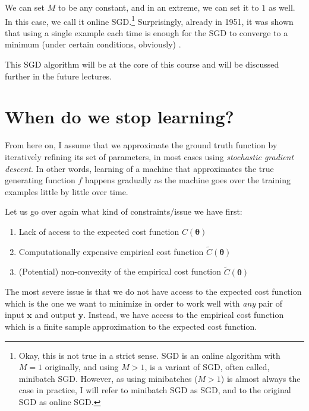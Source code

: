 \documentclass{report}
\newcommand{\vect}[1]{\mathbf{#1}}
\newcommand{\vects}[1]{\boldsymbol{#1}}
\newcommand{\vx}[0]{\vect{x}}
\newcommand{\vy}[0]{\vect{y}}
\newcommand{\TT}[0]{\vects{\theta}}
\begin{document}
We can set $M$ to be any constant, and in an extreme, we can set it to $1$ as
well. In this case, we call it online SGD.\footnote{
    Okay, this is not true in a strict sense. SGD is an online algorithm with
    $M=1$ originally, and using $M>1$, is a variant of SGD, often called,
    minibatch SGD. However, as using minibatches ($M>1$) is almost always the
    case in practice, I will refer to minibatch SGD as SGD, and to the original
    SGD as online SGD.
} Surprisingly, already in 1951, it was shown that using a single example each
time is enough for the SGD to converge to a minimum (under certain conditions,
obviously) \cite{Robbins1951}.

This SGD algorithm will be at the core of this course and will be discussed
further in the future lectures.


\section{When do we stop learning?}
\label{sec:model_selection}

From here on, I assume that we approximate the ground truth function by
iteratively refining its set of parameters, in most cases using {\em stochastic
gradient descent}. In other words, learning of a machine that approximates the
true generating function $f$ happens gradually as the machine goes over the
training examples little by little over time.

Let us go over again what kind of constraints/issue we have first:
\begin{enumerate}
    \item Lack of access to the expected cost function $C(\TT)$
    \item Computationally expensive empirical cost function $\tilde{C}(\TT)$
    \item (Potential) non-convexity of the empirical cost function
        $\tilde{C}(\TT)$
\end{enumerate}

The most severe issue is that we do not have access to the expected cost
function which is the one we want to minimize in order to work well with {\em
any} pair of input $\vx$ and output $\vy$. Instead, we have access to the
empirical cost function which is a finite sample approximation to the expected
cost function. 
\end{document}
